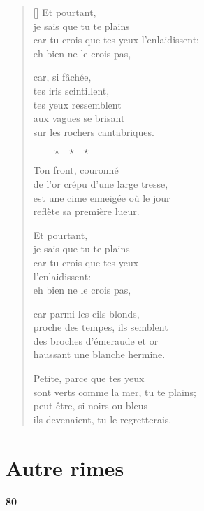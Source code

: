 \documentclass[a4paper,12pt]{book}
\begin{document}
\begin{verse}[\versewidth]
  Et pourtant, \\
  je sais que tu te plains \\
  car tu crois que tes yeux
  l'enlaidissent: \\
  eh bien ne le crois pas,

  car, si fâchée, \\
  tes iris scintillent, \\
  tes yeux ressemblent \\
  aux vagues se brisant \\
  sur les rochers cantabriques.

  $\ \ \ \ \ \ \ \ \ \star \ \ \ \star \ \ \ \star$

  Ton front, couronné \\
  de l'or crépu d'une large tresse, \\
  est une cime enneigée où le jour \\
  reflète sa première lueur.

  Et pourtant, \\
  je sais que tu te plains \\
  car tu crois que tes yeux \\
  l'enlaidissent: \\
  eh bien ne le crois pas,

  car parmi les cils blonds, \\
  proche des tempes, ils semblent \\
  des broches d'émeraude et or \\
  haussant une blanche hermine.

  Petite, parce que tes yeux \\
  sont verts comme la mer, tu te plains; \\
  peut-être, si noirs ou bleus \\
  ils devenaient, tu le regretterais.
\end{verse}


\chapter{Autre rimes}

\begin{center}
  \textbf{80}
\end{center}

\settowidth{\versewidth}{un songe qui durerait jusqu'à la mort...!}
\end{document}
